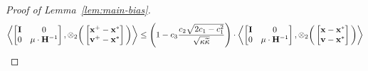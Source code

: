 \begin{proof}[Proof of Lemma~\ref{lem:main-bias}]
\begin{align}
\label{eq:biasContraction}
\left\langle \begin{bmatrix}\mathbf{I}&0\\0&\mu\cdot{\mathbf{H}}^{-1}\end{bmatrix}, \otimes_{2}\bigg(\begin{bmatrix}\mathbf{x}^+-\mathbf{x}^*\\\mathbf{v}^+-\mathbf{x}^*\end{bmatrix}\bigg) \right\rangle\leq\left(1-c_3\frac{c_2\sqrt{2c_1-c_1^2}}{\sqrt{{\kappa}\widetilde{\kappa}}}\right)\cdot\left\langle \begin{bmatrix}\mathbf{I}&0\\0&\mu\cdot{\mathbf{H}}^{-1}\end{bmatrix}, \otimes_{2}\bigg(\begin{bmatrix}\mathbf{x}-\mathbf{x}^*\\\mathbf{v}-\mathbf{x}^*\end{bmatrix}\bigg) \right\rangle
\end{align}


\end{proof}
